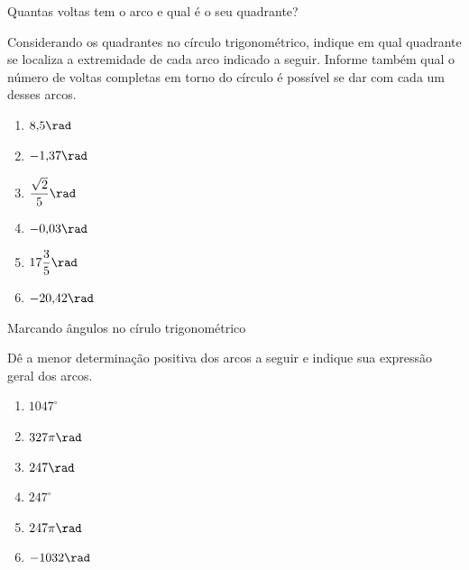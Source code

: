 \begin{task}{Quantas voltas tem o arco e qual é o seu quadrante?}
\label{trig-ativ13}

Considerando os quadrantes no círculo trigonométrico, indique em qual quadrante se localiza a extremidade de cada arco indicado a seguir. Informe também qual o número de voltas completas em torno do círculo é possível se dar com cada um desses arcos.

\begin{enumerate}
\item $8{,}5\rad$
\item $-1{,}37\rad$
\item $\dfrac{\sqrt{2}}{5}\rad$
\item $-0{,}03\rad$
\item $17\dfrac{3}{5}\rad$
\item $-20{,}42\rad$
\end{enumerate}
\end{task}

\begin{task}{Marcando ângulos no círulo trigonométrico}
\label{trig-ativ14}

Dê a menor determinação positiva dos arcos a seguir e indique sua expressão geral dos arcos.
\begin{enumerate}
\item $1047^{\circ}$
\item $327\pi\rad$
\item $247\rad$
\item $247^{\circ}$
\item $247\pi\rad$
\item $-1032\rad$
\end{enumerate}
\end{task}

\label{trig-exp4}

